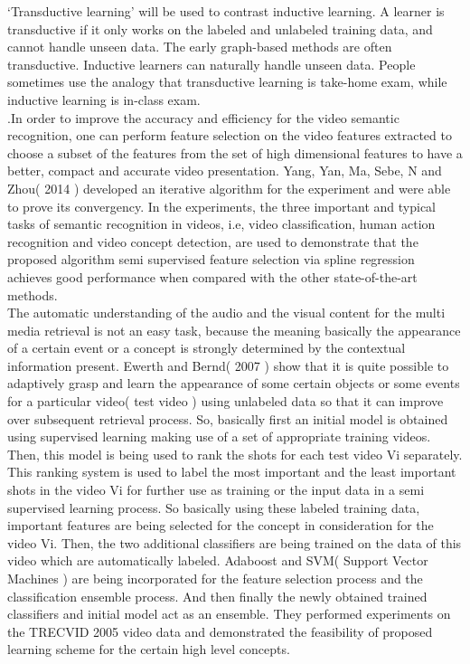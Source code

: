\documentclass[a4paper,12pt]{article}
\begin{document}
‘Transductive learning’ will be used to contrast inductive learning. A learner is transductive if it only works on the labeled and unlabeled training data, and cannot handle unseen data. The early graph-based methods are often transductive. Inductive learners can naturally handle unseen data. People sometimes use the analogy that transductive learning is take-home exam, while inductive learning is in-class exam.
\\
.In order to improve the accuracy and efficiency for the video semantic recognition, one can perform feature selection on the video features extracted to choose a subset of the features from the set of high dimensional features to have a better, compact and accurate video presentation. Yang, Yan, Ma, Sebe, N and Zhou( 2014 ) developed an iterative algorithm for the experiment and were able to prove its convergency. In the experiments, the three important and typical tasks of semantic recognition in videos, i.e, video classification, human action recognition and video concept detection, are used to demonstrate that the proposed algorithm semi supervised feature selection via spline regression achieves good performance when compared with the other state-of-the-art methods.
\\
 The automatic understanding of the audio and the visual content for the multi media retrieval is not an easy task, because the meaning basically the appearance of a certain event or a concept is strongly determined by the contextual information present. Ewerth and Bernd( 2007 ) show that it is quite possible to adaptively grasp and learn the appearance of some certain objects or some events for a particular video( test video ) using unlabeled data so that it can improve over subsequent retrieval process. So, basically first an initial model is obtained using supervised learning making use of a set of appropriate training videos. Then, this model is being used to rank the shots for each test video Vi separately. This ranking system is used to label the most important and the least important shots in the video Vi for further use as training or the input data in a semi supervised learning process. So basically using these labeled training data, important features are being selected for the concept in consideration for the video Vi. Then, the two additional classifiers are being trained on the data of this video which are automatically labeled. Adaboost and SVM( Support Vector Machines ) are being incorporated for the feature selection process and the classification ensemble process. And then finally the newly obtained trained classifiers and initial model act as an ensemble. They performed experiments on the TRECVID 2005 video data and demonstrated the feasibility of proposed learning scheme for the certain high level concepts. \\
\end{document}
